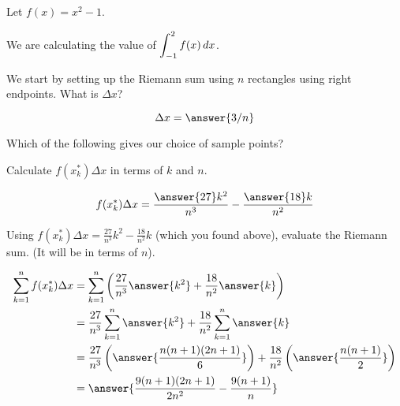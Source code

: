 \documentclass{ximera}
\author{Bobby Ramsey}
\begin{document}
\begin{exercise}
Let $f(x) = x^2-1$. 
		\begin{center}
		\end{center}

We are calculating the value of $\displaystyle \int_{-1}^{2} f(x) \mathop{}\!d x$.



	We start by setting up the Riemann sum using $n$ rectangles using right endpoints.
	What is $\Delta x$?
	
	\[ \Delta x = \answer{3/n} \]

	\begin{exercise}
		Which of the following gives our choice of sample points?
		\begin{multipleChoice}
		\end{multipleChoice}
		
		\begin{exercise}
			Calculate $f(x_k^*) \Delta x$ in terms of $k$ and $n$.
			
			\[ f(x_k^*) \Delta x = \frac{\answer{27}k^2}{n^3}-\frac{\answer{18}k}{n^2} \]
			\begin{exercise}
				Using $f(x_k^*)\Delta x = \frac{27}{n^3}k^2 - \frac{18}{n^2}k$ (which you found above), evaluate the Riemann sum.  (It will be in terms of $n$).
				
				\begin{align*}
					\sum_{k=1}^{n} f(x_k^*)\Delta x &=  \sum_{k=1}^{n} \left(\frac{27}{n^3}\answer{k^2} + \frac{18}{n^2}\answer{k}\right)\\
						&= \frac{27}{n^3} \sum_{k=1}^{n} \answer{k^2} + \frac{18}{n^2} \sum_{k=1}^{n} \answer{k}\\
						&= \frac{27}{n^3} \left( \answer{\frac{n(n+1)(2n+1)}{6}}\right) + \frac{18}{n^2} \left( \answer{\frac{n(n+1)}{2}}\right)\\
						&= \answer{\frac{9(n+1)(2n+1)}{2n^2}-\frac{9(n+1)}{n}}
				\end{align*}
				

\end{exercise}
\end{exercise}
\end{exercise}
\end{exercise}
\end{document}

